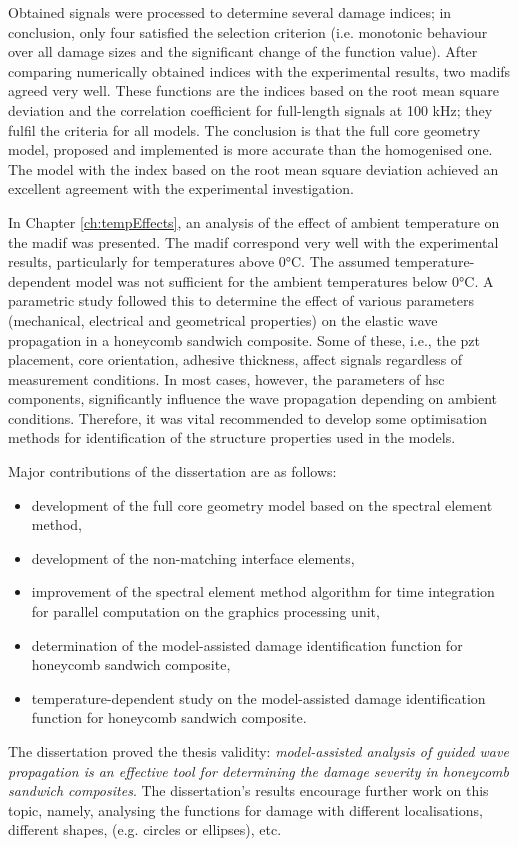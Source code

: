 Obtained signals were processed to determine several damage indices; in conclusion, only four satisfied the selection criterion (i.e. monotonic behaviour over all damage sizes and the significant change of the function value).
After comparing numerically obtained indices with the experimental results, two \acfp{madif} agreed very well.
These functions are the indices based on the root mean square deviation and the correlation coefficient for full-length signals at 100 \unit{\kHz}; they fulfil the criteria for all models.
The conclusion is that the full core geometry model, proposed and implemented is more accurate than the homogenised one.
The model with the index based on the root mean square deviation achieved an excellent agreement with the experimental investigation.

In Chapter \ref{ch:tempEffects}, an analysis of the effect of ambient temperature on the \ac{madif} was presented.
The \ac{madif} correspond very well with the experimental results, particularly for temperatures above 0\unit{\degreeCelsius}.
The assumed temperature-dependent model was not sufficient for the ambient temperatures below 0\unit{\degreeCelsius}.
A parametric study followed this to determine the effect of various parameters (mechanical, electrical and geometrical properties) on the elastic wave propagation in a honeycomb sandwich composite. 
Some of these, i.e., the \ac{pzt} placement, core orientation, adhesive thickness, affect signals regardless of measurement conditions.
In most cases, however, the parameters of \ac{hsc} components, significantly influence the wave propagation depending on ambient conditions.
Therefore, it was vital recommended to develop some optimisation methods for identification of the structure properties used in the models.

Major contributions of the dissertation are as follows:
\begin{itemize}
	\item development of the full core geometry model based on the spectral element method,
	\item development of the non-matching interface elements,
	\item improvement of the spectral element method algorithm for time integration for parallel computation on the graphics processing unit,
	\item determination of the model-assisted damage identification function for honeycomb sandwich composite,
	\item temperature-dependent study on the model-assisted damage identification function for honeycomb sandwich composite.
\end{itemize}
\clearpage
The dissertation proved the thesis validity: \textit{model-assisted analysis of guided wave propagation is an effective tool for determining the damage severity in honeycomb sandwich composites}.
The dissertation's results encourage further work on this topic, namely, analysing the functions for damage with different localisations, different shapes, (e.g. circles or ellipses), etc.
